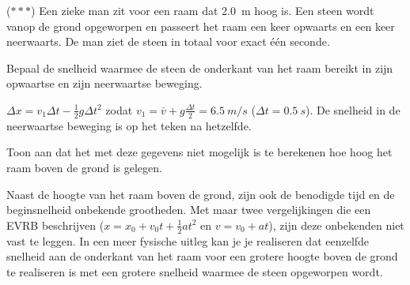 \documentclass{ximera}
\begin{document}
\begin{exercise}
    ($\ast\ast\ast$) Een zieke man zit voor een raam dat \SI{2,0}{m} hoog is. Een steen wordt vanop de grond opgeworpen en passeert het raam een keer opwaarts en een keer neerwaarts. De man ziet de steen in totaal voor exact één seconde.%

    \begin{question} Bepaal de snelheid waarmee de steen de onderkant van het raam bereikt in zijn opwaartse en zijn neerwaartse beweging.  
        \begin{oplossing} $\Delta x= v_1\Delta t-\frac{1}{2}g\Delta t^2$ zodat $v_1=\bar{v}+g\frac{\Delta t}{2}=\SI{6,5}{m/s}$ ($\Delta t = \SI{0,5}{s}$). De snelheid in de neerwaartse beweging is op het teken na hetzelfde.
        \end{oplossing} 
    \end{question} %
    
    \begin{question} Toon aan dat het met deze gegevens niet mogelijk is te berekenen hoe hoog het raam boven de grond is gelegen. 
        \begin{oplossing} Naast de hoogte van het raam boven de grond, zijn ook de benodigde tijd en de beginsnelheid onbekende grootheden. Met maar twee vergelijkingen die een EVRB beschrijven ($x=x_0+v_0t+\frac{1}{2}at^2$ en $v=v_0+at$), zijn deze onbekenden niet vast te leggen. 
        In een meer fysische uitleg kan je je realiseren dat eenzelfde snelheid aan de onderkant van het raam voor een grotere hoogte boven de grond te realiseren is met een grotere snelheid waarmee de steen opgeworpen wordt. 
        \end{oplossing} 
    \end{question} 
\end{exercise}
\end{document}
